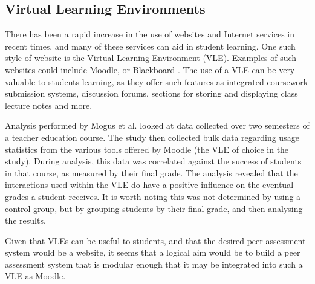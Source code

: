 \documentclass[a4paper,11pt]{report}
\begin{document}
\subsection{Virtual Learning Environments}
There has been a rapid increase in the use of websites and Internet services in recent times, and many of these services can aid in student learning. One such style of website is the Virtual Learning Environment (VLE). Examples of such websites could include Moodle, \cite{moodle_about_2016} or Blackboard \cite{blackboard_blackboard_2016}. The use of a VLE can be very valuable to students learning, as they offer such features as integrated coursework submission systems, discussion forums, sections for storing and displaying class lecture notes and more.\par
Analysis performed by Mogus et al. \cite{mogus_impact_2012} looked at data collected over two semesters of a teacher education course. The study then collected bulk data regarding usage statistics from the various tools offered by Moodle (the VLE of choice in the study). During analysis, this data was correlated against the success of students in that course, as measured by their final grade. The analysis 
revealed that the interactions used within the VLE do have a positive influence on the eventual grades a student receives. It is worth noting this was not determined by using a control group, but by grouping students by their final grade, and then analysing the results.\par
Given that VLEs can be useful to students, and that the desired peer assessment system would be a website, it seems that a logical aim would be to build a peer assessment system that is modular enough that it may be integrated into such a VLE as Moodle.\par
\end{document}
